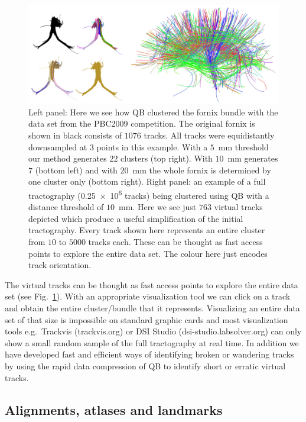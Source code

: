 \documentclass[preprint,authoryear,a4paper,10pt,onecolumn]{elsarticle}
\begin{document}
\begin{figure}
\begin{centering}
\includegraphics[scale=0.6]{Fig_6_QB_simple}
\par\end{centering}
\caption{Left panel: Here we see how QB clustered the fornix bundle with the
  data set from the PBC2009 competition. The original fornix is shown in
  black consists of $1076$ tracks. All tracks were equidistantly
  downsampled at $3$ points in this example. With a $5$~mm threshold our
  method generates $22$ clusters (top right). With $10$~mm generates $7$
  (bottom left) and with $20$~mm the whole fornix is determined by one
  cluster only (bottom right). Right panel: an example of a full tractography
  (\num{0.25e6} tracks) being clustered using QB with a distance threshold
  of $10$~mm. Here we see just $763$ virtual tracks depicted which
  produce a useful simplification of the initial tractography. Every
  track shown here represents an entire cluster from $10$ to $5000$
  tracks each. These can be thought as fast access points to explore the
  entire data set. The colour here just encodes track
  orientation.\label{Flo:QB_fornix}}
\centering{}
\end{figure}

The virtual tracks can be thought as fast access points to explore the
entire data set (see Fig.~\ref{Flo:QB_fornix}). With an appropriate
visualization tool we can click on a track and obtain the entire
cluster/bundle that it represents. Visualizing an entire data set of
that size is impossible on standard graphic cards and most visualization
tools e.g.~Trackvis (trackvis.org) or DSI Studio
(dsi-studio.labsolver.org) can only show a small random sample of the
full tractography at real time. In addition we have developed fast and
efficient ways of identifying broken or wandering tracks by using the
rapid data compression of QB to identify short or erratic virtual
tracks.

\subsection{Alignments, atlases and landmarks\label{sub:Atlases-made-easy}}
\end{document}
